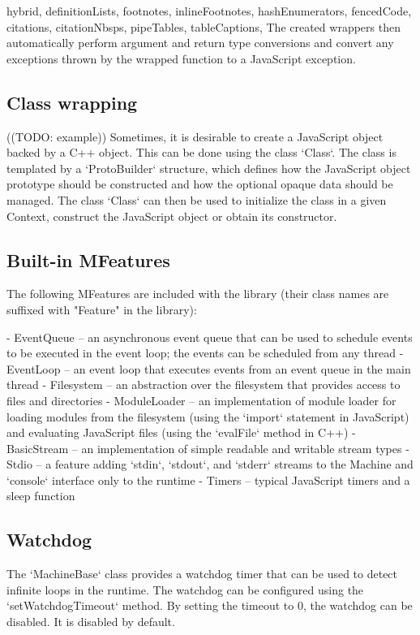 \begin{markdown*}{%
  hybrid,
  definitionLists,
  footnotes,
  inlineFootnotes,
  hashEnumerators,
  fencedCode,
  citations,
  citationNbsps,
  pipeTables,
  tableCaptions,
}
The created wrappers then automatically perform argument and return type conversions and convert any exceptions thrown by the wrapped function to a JavaScript exception.

\subsection{Class wrapping} \label{sub:class-wrapping}

((TODO: example))
Sometimes, it is desirable to create a JavaScript object backed by a C++ object. This can be done using the class `Class`. The class is templated by a `ProtoBuilder` structure, which defines how the JavaScript object prototype should be constructed and how the optional opaque data should be managed. The class `Class` can then be used to initialize the class in a given Context, construct the JavaScript object or obtain its constructor.

\subsection{Built-in MFeatures}

The following MFeatures are included with the library (their class names are suffixed with "Feature" in the library):

  - EventQueue -- an asynchronous event queue that can be used to schedule events to be executed in the event loop; the events can be scheduled from any thread
  - EventLoop -- an event loop that executes events from an event queue in the main thread
  - Filesystem -- an abstraction over the filesystem that provides access to files and directories
  - ModuleLoader -- an implementation of module loader for loading modules from the filesystem (using the `import` statement in JavaScript) and evaluating JavaScript files (using the `evalFile` method in C++)
  - BasicStream -- an implementation of simple readable and writable stream types
  - Stdio -- a feature adding `stdin`, `stdout`, and `stderr` streams to the Machine and `console` interface only to the runtime
  - Timers -- typical JavaScript timers and a sleep function

\subsection{Watchdog}

The `MachineBase` class provides a watchdog timer that can be used to detect infinite loops in the runtime. The watchdog can be configured using the `setWatchdogTimeout` method. By setting the timeout to 0, the watchdog can be disabled. It is disabled by default.


\end{markdown*}
